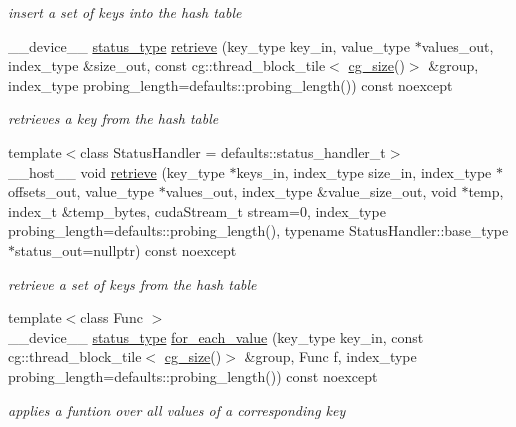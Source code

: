 \begin{DoxyCompactItemize}
\begin{DoxyCompactList}\small\item\em insert a set of keys into the hash table \end{DoxyCompactList}\item 
\+\_\+\+\_\+device\+\_\+\+\_\+ \hyperlink{classwarpcore_1_1Status}{status\+\_\+type} \hyperlink{classwarpcore_1_1MultiValueHashTable_a05ca99d972b19ae69bbce6a9d6990b4c}{retrieve} (key\+\_\+type key\+\_\+in, value\+\_\+type $\ast$values\+\_\+out, index\+\_\+type \&size\+\_\+out, const cg\+::thread\+\_\+block\+\_\+tile$<$ \hyperlink{classwarpcore_1_1MultiValueHashTable_a2191f42810234e459bc4ef6e491ec929}{cg\+\_\+size}()$>$ \&group, index\+\_\+type probing\+\_\+length=defaults\+::probing\+\_\+length()) const noexcept
\begin{DoxyCompactList}\small\item\em retrieves a key from the hash table \end{DoxyCompactList}\item 
{\footnotesize template$<$class Status\+Handler  = defaults\+::status\+\_\+handler\+\_\+t$>$ }\\\+\_\+\+\_\+host\+\_\+\+\_\+ void \hyperlink{classwarpcore_1_1MultiValueHashTable_a4f7941cfe49e656d0f31938f8c8c88f1}{retrieve} (key\+\_\+type $\ast$keys\+\_\+in, index\+\_\+type size\+\_\+in, index\+\_\+type $\ast$offsets\+\_\+out, value\+\_\+type $\ast$values\+\_\+out, index\+\_\+type \&value\+\_\+size\+\_\+out, void $\ast$temp, index\+\_\+t \&temp\+\_\+bytes, cuda\+Stream\+\_\+t stream=0, index\+\_\+type probing\+\_\+length=defaults\+::probing\+\_\+length(), typename Status\+Handler\+::base\+\_\+type $\ast$status\+\_\+out=nullptr) const noexcept
\begin{DoxyCompactList}\small\item\em retrieve a set of keys from the hash table \end{DoxyCompactList}\item 
{\footnotesize template$<$class Func $>$ }\\\+\_\+\+\_\+device\+\_\+\+\_\+ \hyperlink{classwarpcore_1_1Status}{status\+\_\+type} \hyperlink{classwarpcore_1_1MultiValueHashTable_aae24b5424491ad31fea85d1d909af6e9}{for\+\_\+each\+\_\+value} (key\+\_\+type key\+\_\+in, const cg\+::thread\+\_\+block\+\_\+tile$<$ \hyperlink{classwarpcore_1_1MultiValueHashTable_a2191f42810234e459bc4ef6e491ec929}{cg\+\_\+size}()$>$ \&group, Func f, index\+\_\+type probing\+\_\+length=defaults\+::probing\+\_\+length()) const noexcept
\begin{DoxyCompactList}\small\item\em applies a funtion over all values of a corresponding key \end{DoxyCompactList}\item 

\end{DoxyCompactItemize}
